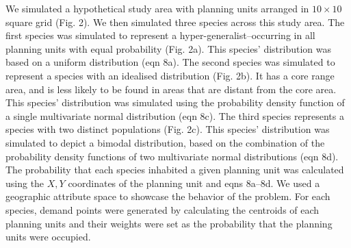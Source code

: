 \documentclass[11pt,]{article}
\begin{document}
We simulated a hypothetical study area with planning units arranged in
$10 \times 10$ square grid (Fig. 2). We then simulated three species
across this study area. The first species was simulated to represent a
hyper-generalist--occurring in all planning units with equal probability
(Fig. 2a). This species' distribution was based on a uniform
distribution (eqn 8a). The second species was simulated to represent a
species with an idealised distribution (Fig. 2b). It has a core range
area, and is less likely to be found in areas that are distant from the
core area. This species' distribution was simulated using the
probability density function of a single multivariate normal
distribution (eqn 8c). The third species represents a species with two
distinct populations (Fig. 2c). This species' distribution was simulated
to depict a bimodal distribution, based on the combination of the
probability density functions of two multivariate normal distributions
(eqn 8d). The probability that each species inhabited a given planning
unit was calculated using the $X, Y$ coordinates of the planning unit
and eqns 8a--8d. We used a geographic attribute space to showcase the
behavior of the problem. For each species, demand points were generated
by calculating the centroids of each planning units and their weights
were set as the probability that the planning units were occupied.
\end{document}
